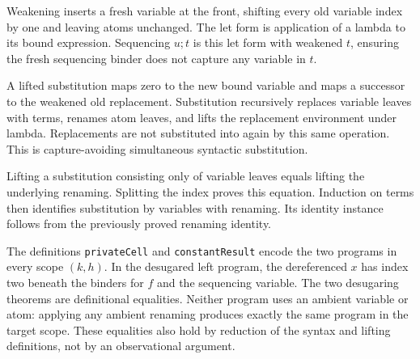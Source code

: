 

Weakening inserts a fresh variable at the front, shifting every old variable
index by one and leaving atoms unchanged. The let form is application of a
lambda to its bound expression. Sequencing $u;t$ is this let form with weakened
$t$, ensuring the fresh sequencing binder does not capture any variable in $t$.




A lifted substitution maps zero to the new bound variable and maps a successor
to the weakened old replacement. Substitution recursively replaces variable
leaves with terms, renames atom leaves, and lifts the replacement environment
under lambda. Replacements are not substituted into again by this same
operation. This is capture-avoiding simultaneous syntactic substitution.



Lifting a substitution consisting only of variable leaves equals lifting the
underlying renaming. Splitting the index proves this equation. Induction on
terms then identifies substitution by variables with renaming. Its identity
instance follows from the previously proved renaming identity.




The definitions \texttt{privateCell} and \texttt{constantResult} encode the two
programs in every scope $(k,h)$. In the desugared left program, the dereferenced
$x$ has index two beneath the binders for $f$ and the sequencing variable.
The two desugaring theorems are definitional equalities. Neither program uses
an ambient variable or atom: applying any ambient renaming produces exactly
the same program in the target scope. These equalities also hold by reduction
of the syntax and lifting definitions, not by an observational argument.


